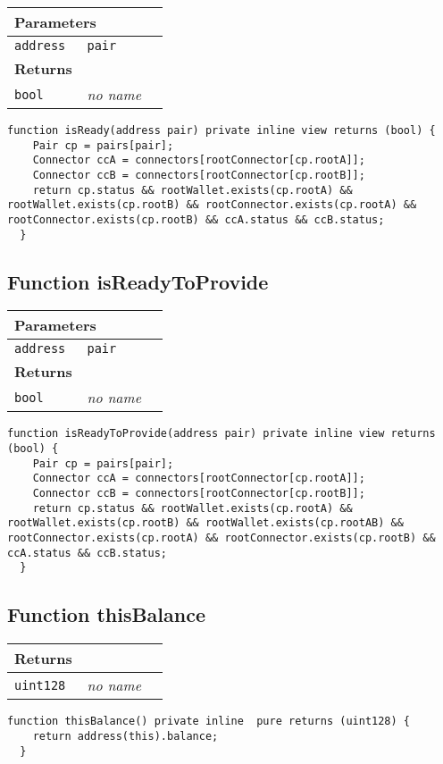 \ifsoltables
\noindent\begin{tabular}{|l|l|p{5cm}|}\hline
\multicolumn{3}{|l|}{\bf Parameters}\\\hline
\tt address & \tt pair &\\\hline
\multicolumn{3}{|l|}{\bf Returns}\\\hline
\tt bool & {\em no name} &\\\hline
\end{tabular}
\fi



\begin{lstlisting}[firstnumber=198]
  function isReady(address pair) private inline view returns (bool) {
    Pair cp = pairs[pair];
    Connector ccA = connectors[rootConnector[cp.rootA]];
    Connector ccB = connectors[rootConnector[cp.rootB]];
    return cp.status && rootWallet.exists(cp.rootA) && rootWallet.exists(cp.rootB) && rootConnector.exists(cp.rootA) && rootConnector.exists(cp.rootB) && ccA.status && ccB.status;
  }
\end{lstlisting}

\subsection{Function isReadyToProvide}


\ifsoltables
\noindent\begin{tabular}{|l|l|p{5cm}|}\hline
\multicolumn{3}{|l|}{\bf Parameters}\\\hline
\tt address & \tt pair &\\\hline
\multicolumn{3}{|l|}{\bf Returns}\\\hline
\tt bool & {\em no name} &\\\hline
\end{tabular}
\fi



\begin{lstlisting}[firstnumber=206]
  function isReadyToProvide(address pair) private inline view returns (bool) {
    Pair cp = pairs[pair];
    Connector ccA = connectors[rootConnector[cp.rootA]];
    Connector ccB = connectors[rootConnector[cp.rootB]];
    return cp.status && rootWallet.exists(cp.rootA) && rootWallet.exists(cp.rootB) && rootWallet.exists(cp.rootAB) && rootConnector.exists(cp.rootA) && rootConnector.exists(cp.rootB) && ccA.status && ccB.status;
  }
\end{lstlisting}

\subsection{Function thisBalance}


\ifsoltables
\noindent\begin{tabular}{|l|l|p{5cm}|}\hline
\multicolumn{3}{|l|}{\bf Returns}\\\hline
\tt uint128 & {\em no name} &\\\hline
\end{tabular}
\fi



\begin{lstlisting}[firstnumber=346]
  function thisBalance() private inline  pure returns (uint128) {
    return address(this).balance;
  }
\end{lstlisting}
